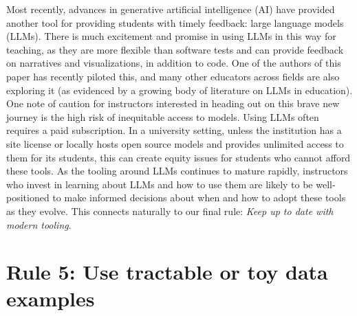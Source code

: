 \documentclass[
  10pt,
  letterpaper,
]{article}
\begin{document}
Most recently, advances in generative artificial intelligence (AI) have
provided another tool for providing students with timely feedback: large
language models (LLMs). There is much excitement and promise in using
LLMs in this way for teaching, as they are more flexible than software
tests and can provide feedback on narratives and visualizations, in
addition to code. One of the authors of this paper has recently piloted
this, and many other educators across fields are also exploring it (as
evidenced by a growing body of literature on LLMs in education). One
note of caution for instructors interested in heading out on this brave
new journey is the high risk of inequitable access to models. Using LLMs
often requires a paid subscription. In a university setting, unless the
institution has a site license or locally hosts open source models and
provides unlimited access to them for its students, this can create
equity issues for students who cannot afford these tools. As the tooling
around LLMs continues to mature rapidly, instructors who invest in
learning about LLMs and how to use them are likely to be well-positioned
to make informed decisions about when and how to adopt these tools as
they evolve. This connects naturally to our final rule: \emph{Keep up to
date with modern tooling}.

\section{Rule 5: Use tractable or toy data examples}\label{sec-rule5}
\end{document}
